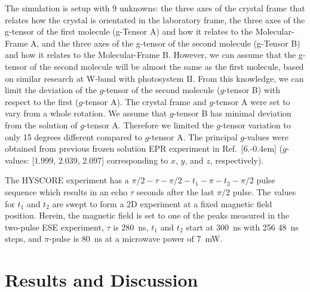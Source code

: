 The simulation is setup with 9 unknowns: the three axes of the crystal frame that relates how the crystal is orientated in the laboratory frame, the three axes of the g-tensor of the first molecule (g-Tensor A) and how it relates to the Molecular-Frame A, and the three axes of the g-tensor of the second molecule (g-Tensor B) and how it relates to the Molecular-Frame B. However, we can assume that the g-tensor of the second molecule will be almost the same as the first molecule, based on similar research at W-band with photosystem II. \cite{Hofbauer6623, B908093G} From this knowledge, we can limit the deviation of the $g$-tensor of the second molecule ($g$-tensor B) with respect to the first ($g$-tensor A). The crystal frame and $g$-tensor A were set to vary from a whole rotation. We assume that $g$-tensor B has minimal deviation from the solution of $g$-tensor A. Therefore we limited the $g$-tensor variation to only 15 degrees different compared to $g$-tensor A. The principal $g$-values were obtained from previous frozen solution EPR experiment in Ref.~[6.\kern-0.4em] ($g$-values: [1.999, 2.039, 2.097] corresponding to $x$, $y$, and $z$, respectively).

The HYSCORE experiment has a ${\pi/2\!-\!\tau\!-\!\pi/2\!-\!t_1\!-\!\pi\!-\!t_2\!-\!\pi/2}$ pulse sequence which results in an echo $\tau$ seconds after the last $\pi/2$ pulse. The values for $t_1$ and $t_2$ are swept to form a 2D experiment at a fixed magnetic field position. Herein, the magnetic field is set to one of the peaks measured in the two-pulse ESE experiment, $\tau$ is 280~ns, $t_1$ and $t_2$ start at 300~ns with 256 48~ns steps, and $\pi$-pulse is 80~ns at a microwave power of 7~mW. 

\section{Results and Discussion}
